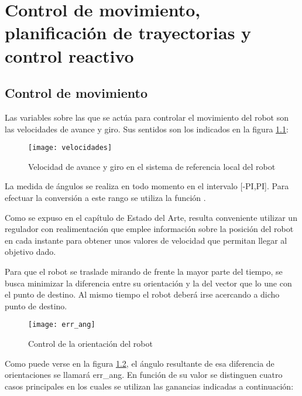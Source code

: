 
\chapter{Control de movimiento, planificación de trayectorias y control reactivo}

\section{Control de movimiento}\label{control}

Las variables sobre las que se actúa para controlar el movimiento del robot son las velocidades de avance y giro. Sus sentidos son los indicados en la figura \ref{fg:velocidades}:

\begin{figure}[hbt]
  \centering\texttt{[image: velocidades]}\\
  \caption{Velocidad de avance y giro en el sistema de referencia local del robot}\label{fg:velocidades}
\end{figure}


La medida de ángulos se realiza en todo momento en el intervalo [-PI,PI]. Para efectuar la conversión a este rango se utiliza la función .

Como se expuso en el capítulo de Estado del Arte, resulta conveniente utilizar un regulador con realimentación que emplee información sobre la posición del robot en cada instante para obtener unos valores de velocidad que permitan llegar al objetivo dado.

Para que el robot se traslade mirando de frente la mayor parte del tiempo, se busca minimizar la diferencia entre su orientación y la del vector que lo une con el punto de destino. Al mismo tiempo el robot deberá irse acercando a dicho punto de destino.

\begin{figure}[hbt]
  \centering\texttt{[image: err\_ang]}\\
  \caption{Control de la orientación del robot}\label{fg:err_ang}
\end{figure}

Como puede verse en la figura \ref{fg:err_ang}, el ángulo resultante de esa diferencia de orientaciones se llamará err\_ang. En función de su valor se distinguen cuatro casos principales en los cuales se utilizan las ganancias indicadas a continuación:

